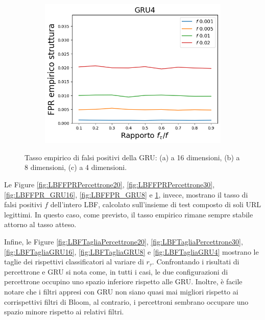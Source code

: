 \documentclass[../../main.tex]{subfiles}
\begin{document}
\begin{figure}[H]
        \begin{subfigure}[b]{0.49\textwidth}
            \centering
            \includegraphics[width = \textwidth]{immagini/7/LBF/GRU4_FPR.png}
            \caption{}
            \label{fig:LBFFPR_GRU4}
        \end{subfigure}
        \caption{Tasso empirico di falsi positivi della GRU: (a) a 16 dimensioni, (b) a 8 dimensioni, (c) a 4 dimensioni.}
        \label{fig:GRU_LBFFPR}
    \end{figure}

    Le Figure \ref{fig:LBFFPRPercettrone20}, \ref{fig:LBFFPRPercettrone30}, \ref{fig:LBFFPR_GRU16}, \ref{fig:LBFFPR_GRU8} e \ref{fig:LBFFPR_GRU4}, invece, mostrano il tasso di falsi positivi $f$ dell'intero LBF, calcolato sull'insieme di test composto di soli URL legittimi. In questo caso, come previsto, il tasso empirico rimane sempre stabile attorno al tasso atteso.

    Infine, le Figure \ref{fig:LBFTagliaPercettrone20}, \ref{fig:LBFTagliaPercettrone30}, \ref{fig:LBFTagliaGRU16}, \ref{fig:LBFTagliaGRU8} e \ref{fig:LBFTagliaGRU4} mostrano le taglie dei rispettivi classificatori al variare di $r_{\tau}$. Confrontando i risultati di percettrone e GRU si nota come, in tutti i casi, le due configurazioni di percettrone occupino uno spazio inferiore rispetto alle GRU. Inoltre, è facile notare che i filtri appresi con GRU non siano quasi mai migliori rispetto ai corrispettivi filtri di Bloom, al contrario, i percettroni sembrano occupare uno spazio minore rispetto ai relativi filtri. 
\end{document}
